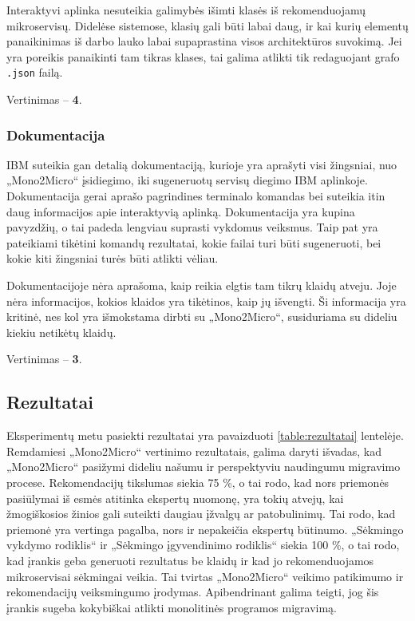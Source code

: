 \documentclass{VUMIFPSbakalaurinis}
\begin{document}
Interaktyvi aplinka nesuteikia galimybės išimti klasės iš rekomenduojamų mikroservisų. Didelėse sistemose, klasių gali būti labai daug, ir kai kurių elementų panaikinimas iš darbo lauko labai supaprastina visos architektūros suvokimą. Jei yra poreikis panaikinti tam tikras klases, tai galima atlikti tik redaguojant grafo \verb|.json| failą.

Vertinimas -- \textbf{4}.

\subsubsection{Dokumentacija}
IBM suteikia gan detalią dokumentaciją, kurioje yra aprašyti visi žingsniai, nuo „Mono2Micro“ įsidiegimo, iki sugeneruotų servisų diegimo IBM aplinkoje. Dokumentacija gerai aprašo pagrindines terminalo komandas bei suteikia itin daug informacijos apie interaktyvią aplinką. Dokumentacija yra kupina pavyzdžių, o tai padeda lengviau suprasti vykdomus veiksmus. Taip pat yra pateikiami tikėtini komandų rezultatai, kokie failai turi būti sugeneruoti, bei kokie kiti žingsniai turės būti atlikti vėliau.

Dokumentacijoje nėra aprašoma, kaip reikia elgtis tam tikrų klaidų atveju. Joje nėra informacijos, kokios klaidos yra tikėtinos, kaip jų išvengti. Ši informacija yra kritinė, nes kol yra išmokstama dirbti su „Mono2Micro“, susiduriama su dideliu kiekiu netikėtų klaidų.

Vertinimas -- \textbf{3}.

\subsection{Rezultatai}
Eksperimentų metu pasiekti rezultatai yra pavaizduoti \ref{table:rezultatai} lentelėje. Remdamiesi „Mono2Micro“ vertinimo rezultatais, galima daryti išvadas, kad „Mono2Micro“ pasižymi dideliu našumu ir perspektyviu naudingumu migravimo procese. Rekomendacijų tikslumas siekia 75 \%, o tai rodo, kad nors priemonės pasiūlymai iš esmės atitinka ekspertų nuomonę, yra tokių atvejų, kai žmogiškosios žinios gali suteikti daugiau įžvalgų ar patobulinimų. Tai rodo, kad priemonė yra vertinga pagalba, nors ir nepakeičia ekspertų būtinumo. „Sėkmingo vykdymo rodiklis“ ir „Sėkmingo įgyvendinimo rodiklis“ siekia 100 \%, o tai rodo, kad įrankis geba generuoti rezultatus be klaidų ir kad jo rekomenduojamos mikroservisai sėkmingai veikia. Tai tvirtas „Mono2Micro“ veikimo patikimumo ir rekomendacijų veiksmingumo įrodymas. Apibendrinant galima teigti, jog šis įrankis sugeba kokybiškai atlikti monolitinės programos migravimą.
\end{document}
